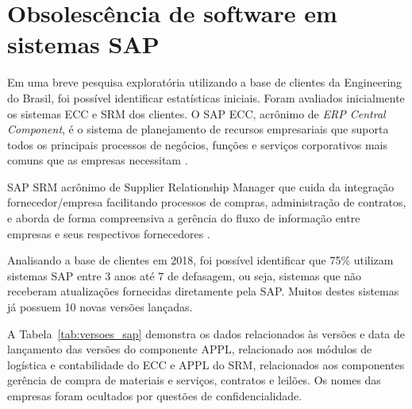 \section{\esp Obsolescência de software em sistemas SAP }

Em uma breve pesquisa exploratória utilizando a base de clientes da Engineering do Brasil, foi possível identificar estatísticas iniciais. Foram avaliados inicialmente os sistemas ECC e SRM dos clientes.
O SAP ECC, acrônimo de \textit{ERP Central Component}, é o sistema de planejamento de recursos empresariais que suporta todos os principais processos de negócios, funções e serviços corporativos mais comuns que as empresas necessitam  \cite{BOEDER2014}.

SAP SRM acrônimo de Supplier Relationship Manager que cuida da integração fornecedor/empresa facilitando processos de compras, administração de contratos, e aborda de forma compreensiva a gerência do fluxo de informação entre empresas e seus respectivos fornecedores \cite{BOEDER2014}.

Analisando a base de clientes em 2018, foi possível identificar que 75\% utilizam sistemas SAP entre 3 anos até 7 de defasagem, ou seja, sistemas que não receberam atualizações fornecidas diretamente pela SAP. Muitos destes sistemas já possuem 10 novas versões lançadas.

A Tabela~\ref{tab:versoes_sap} demonstra os dados relacionados às versões e data de lançamento das versões do componente APPL, relacionado aos módulos de logística e contabilidade do ECC e APPL do SRM, relacionados aos componentes gerência de compra de materiais e serviços, contratos e leilões. Os nomes das empresas foram ocultados por questões de confidencialidade.

